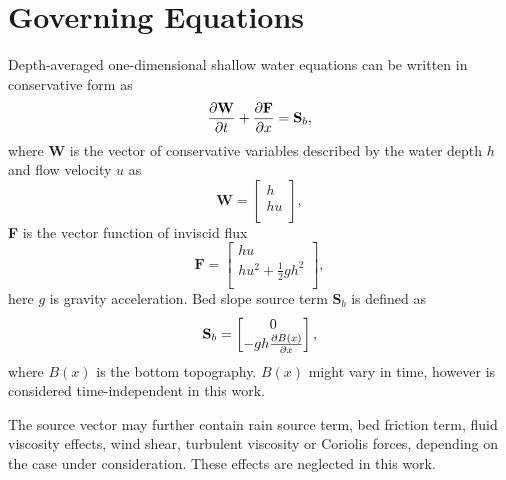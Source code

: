 \section{Governing Equations}
Depth-averaged one-dimensional shallow water equations can be written in 
conservative form as
\begin{equation}\label{SWE1D}
\frac{\partial \mathbf{W}}{\partial t}+
\frac{\partial \mathbf{F}}{\partial x}=\mathbf{S}_b,
\end{equation}
where \textbf{W} is the vector of conservative variables described by the 
water depth $h$ and flow velocity $u$ as
\begin{equation}\label{konz}
\mathbf{W}=\begin{bmatrix}
h\\
hu\\
\end{bmatrix},
\end{equation}
\textbf{F} is the vector function of inviscid flux
\begin{equation}\label{flux}
\mathbf{F}=\begin{bmatrix}
hu \\ 
hu^2 + \frac{1}{2}g h^2\\
\end{bmatrix},
\end{equation}
here $g$ is gravity acceleration. Bed slope source term $\mathbf{S}_{b}$ is defined as
\begin{equation}\label{Sb}
\mathbf{S}_{b}=\begin{bmatrix}
0 \\
-g h\frac{\partial B(x)}{\partial x}\\
\end{bmatrix},
\end{equation}
where $B(x)$ is the bottom topography. $B(x)$ might vary in time, however 
is considered time-independent in this work.

The source vector may further contain rain source term, bed friction term, fluid viscosity effects, wind shear, turbulent viscosity or Coriolis forces, depending on the case under consideration. These effects are neglected in this work. 
